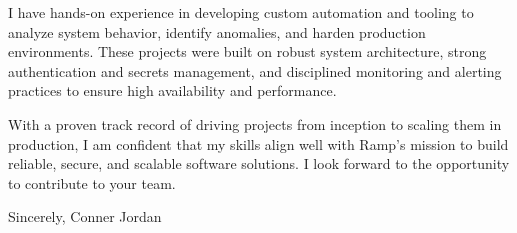 \documentclass[letterpaper,11pt]{article}
\begin{document}
\vspace{16pt}

I have hands-on experience in developing custom automation and tooling to analyze system behavior, identify anomalies, and harden production environments. These projects were built on robust system architecture, strong authentication and secrets management, and disciplined monitoring and alerting practices to ensure high availability and performance.

\vspace{16pt}

With a proven track record of driving projects from inception to scaling them in production, I am confident that my skills align well with Ramp's mission to build reliable, secure, and scalable software solutions. I look forward to the opportunity to contribute to your team.

\vspace{16pt}

Sincerely,  
Conner Jordan
\end{document}
